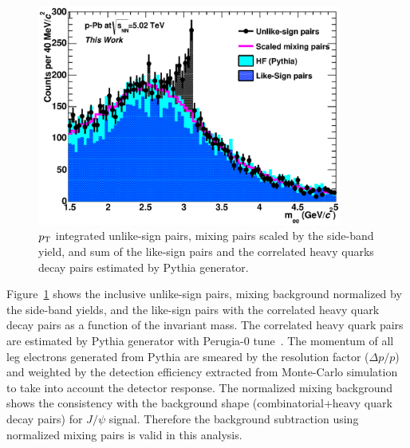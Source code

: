 {\begin{figure}[!h]
  \centering
  \includegraphics[width=10cm]{chap4/figure/RawYield/BGComposition_MB.eps}
  \caption{$p_{\rm{T}}$ integrated unlike-sign pairs, mixing pairs scaled by the side-band yield, and sum of the like-sign pairs and the correlated heavy quarks decay pairs estimated by Pythia generator.  }
  \label{fig_4_ulsplusbg}
\end{figure}
Figure~\ref{fig_4_ulsplusbg} shows the inclusive unlike-sign pairs, mixing background normalized by the side-band yields, and the like-sign pairs with the correlated heavy quark decay pairs as a function of the invariant mass. 
The correlated heavy quark pairs are estimated by Pythia generator with Perugia-0 tune~\cite{bib_pythia,bib_pythiaperugia}.
The momentum of all leg electrons generated from Pythia are smeared by the resolution factor ($\Delta p/p$) and weighted by the detection efficiency extracted from Monte-Carlo simulation to take into account the detector response.   
The normalized mixing background shows the consistency with the background shape (combinatorial+heavy quark decay pairs) for $J/\psi$ signal.  
Therefore the background subtraction using normalized mixing pairs is valid in this analysis.    

}
